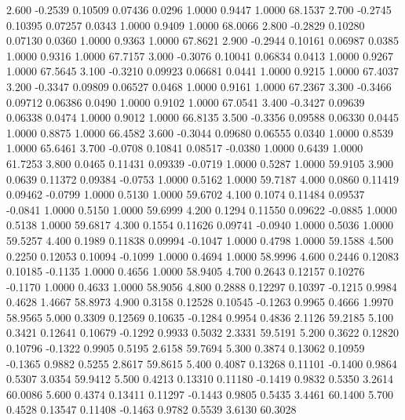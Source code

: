    2.600  -0.2539   0.10509   0.07436   0.0296   1.0000   0.9447   1.0000  68.1537
   2.700  -0.2745   0.10395   0.07257   0.0343   1.0000   0.9409   1.0000  68.0066
   2.800  -0.2829   0.10280   0.07130   0.0360   1.0000   0.9363   1.0000  67.8621
   2.900  -0.2944   0.10161   0.06987   0.0385   1.0000   0.9316   1.0000  67.7157
   3.000  -0.3076   0.10041   0.06834   0.0413   1.0000   0.9267   1.0000  67.5645
   3.100  -0.3210   0.09923   0.06681   0.0441   1.0000   0.9215   1.0000  67.4037
   3.200  -0.3347   0.09809   0.06527   0.0468   1.0000   0.9161   1.0000  67.2367
   3.300  -0.3466   0.09712   0.06386   0.0490   1.0000   0.9102   1.0000  67.0541
   3.400  -0.3427   0.09639   0.06338   0.0474   1.0000   0.9012   1.0000  66.8135
   3.500  -0.3356   0.09588   0.06330   0.0445   1.0000   0.8875   1.0000  66.4582
   3.600  -0.3044   0.09680   0.06555   0.0340   1.0000   0.8539   1.0000  65.6461
   3.700  -0.0708   0.10841   0.08517  -0.0380   1.0000   0.6439   1.0000  61.7253
   3.800   0.0465   0.11431   0.09339  -0.0719   1.0000   0.5287   1.0000  59.9105
   3.900   0.0639   0.11372   0.09384  -0.0753   1.0000   0.5162   1.0000  59.7187
   4.000   0.0860   0.11419   0.09462  -0.0799   1.0000   0.5130   1.0000  59.6702
   4.100   0.1074   0.11484   0.09537  -0.0841   1.0000   0.5150   1.0000  59.6999
   4.200   0.1294   0.11550   0.09622  -0.0885   1.0000   0.5138   1.0000  59.6817
   4.300   0.1554   0.11626   0.09741  -0.0940   1.0000   0.5036   1.0000  59.5257
   4.400   0.1989   0.11838   0.09994  -0.1047   1.0000   0.4798   1.0000  59.1588
   4.500   0.2250   0.12053   0.10094  -0.1099   1.0000   0.4694   1.0000  58.9996
   4.600   0.2446   0.12083   0.10185  -0.1135   1.0000   0.4656   1.0000  58.9405
   4.700   0.2643   0.12157   0.10276  -0.1170   1.0000   0.4633   1.0000  58.9056
   4.800   0.2888   0.12297   0.10397  -0.1215   0.9984   0.4628   1.4667  58.8973
   4.900   0.3158   0.12528   0.10545  -0.1263   0.9965   0.4666   1.9970  58.9565
   5.000   0.3309   0.12569   0.10635  -0.1284   0.9954   0.4836   2.1126  59.2185
   5.100   0.3421   0.12641   0.10679  -0.1292   0.9933   0.5032   2.3331  59.5191
   5.200   0.3622   0.12820   0.10796  -0.1322   0.9905   0.5195   2.6158  59.7694
   5.300   0.3874   0.13062   0.10959  -0.1365   0.9882   0.5255   2.8617  59.8615
   5.400   0.4087   0.13268   0.11101  -0.1400   0.9864   0.5307   3.0354  59.9412
   5.500   0.4213   0.13310   0.11180  -0.1419   0.9832   0.5350   3.2614  60.0086
   5.600   0.4374   0.13411   0.11297  -0.1443   0.9805   0.5435   3.4461  60.1400
   5.700   0.4528   0.13547   0.11408  -0.1463   0.9782   0.5539   3.6130  60.3028
